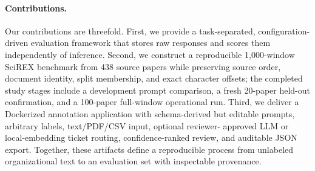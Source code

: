 \paragraph{Contributions.}
Our contributions are threefold. First, we provide a task-separated,
configuration-driven evaluation framework that stores raw responses and scores
them independently of inference. Second, we construct a reproducible
1{,}000-window SciREX benchmark from 438 source papers while preserving source
order, document identity, split membership, and exact character offsets; the
completed study stages include a development prompt comparison, a fresh
20-paper held-out confirmation, and a 100-paper full-window operational run.
Third, we deliver a Dockerized annotation application with schema-derived but
editable prompts, arbitrary labels, text/PDF/CSV input, optional reviewer-
approved LLM or local-embedding ticket routing, confidence-ranked review, and
auditable JSON export.
Together, these artifacts define a reproducible process from unlabeled
organizational text to an evaluation set with inspectable provenance.
